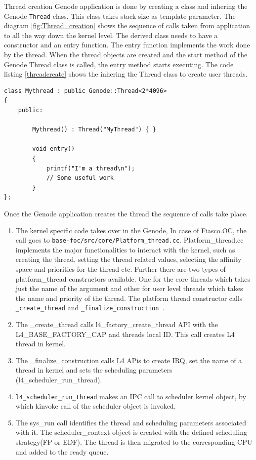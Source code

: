 Thread creation Genode application is done by creating a class and inhering the Genode \texttt{Thread} class. This class takes stack size as template parameter. The diagram \ref{fig:Thread_creation}
shows the sequence of calls taken from application to all the way down the kernel level.  
The derived class needs to have a constructor and an entry function. The entry function implements the work done by the thread. When the thread objects are created and the start method of the Genode Thread class is called, the entry method starts executing. The code listing \ref{threadcreate} shows the inhering the Thread class to create user threads.

\begin{lstlisting}[caption={Thread creation class},label={threadcreate}, style=customcpp]
class Mythread : public Genode::Thread<2*4096>
{
	public:

		Mythread() : Thread("MyThread") { }

		void entry()
		{
			printf("I'm a thread\n");
			// Some useful work
		}
};
\end{lstlisting}

Once the Genode application creates the thread the sequence of calls take place.

\begin{enumerate}
\item The kernel specific code takes over in the Genode, In case of Fiasco.OC, the call goes to \texttt{base-foc/src/core/Platform\_thread.cc}. Platform\_thread.cc implements the major functionalities to interact with the kernel, such as creating the thread, setting the thread related values, selecting the affinity space and priorities for the thread etc. Further there are two types of platform\_thread constructors available. One for the core threads which takes just the name of the argument and other for user level threads which takes the name and priority of the thread.  The platform thread constructor calls \texttt{\_create\_thread} and \texttt{\_finalize\_construction }.

\item The \_create\_thread calls l4\_factory\_create\_thread API with the L4\_BASE\_FACTORY\_CAP and threads local ID. This call creates L4 thread in kernel. 

\item The \_finalize\_construction calls L4 APis to create IRQ, set the name of a thread in kernel and sets the scheduling parameters (l4\_scheduler\_run\_thread).

\item \texttt{l4\_scheduler\_run\_thread} makes an IPC call to scheduler kernel object, by which kinvoke call of the scheduler object is invoked.

\item The sys\_run call identifies the thread and scheduling parameters associated with it. The scheduler\_context object is created with the defined scheduling strategy(FP or EDF). The thread is then migrated to the corresponding CPU and added to the ready queue.  
\end{enumerate}

